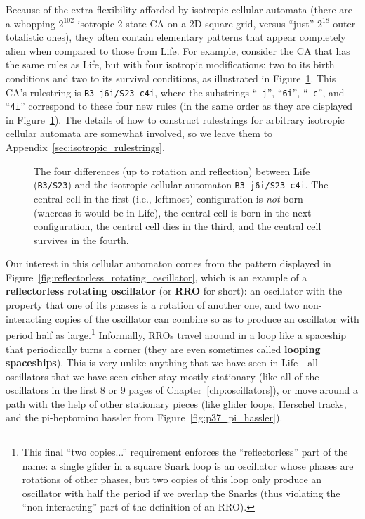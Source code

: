 Because of the extra flexibility afforded by isotropic cellular automata (there are a whopping $2^{102}$ isotropic $2$-state CA on a 2D square grid, versus ``just'' $2^{18}$ outer-totalistic ones), they often contain elementary patterns that appear completely alien when compared to those from Life. For example, consider the CA that has the same rules as Life, but with four isotropic modifications: two to its birth conditions and two to its survival conditions, as illustrated in Figure~\ref{fig:iso_rule_modifications}. This CA's rulestring is \texttt{B3-j6i/S23-c4i}, where the substrings ``\texttt{-j}'', ``\texttt{6i}'', ``\texttt{-c}'', and ``\texttt{4i}'' correspond to these four new rules (in the same order as they are displayed in Figure~\ref{fig:iso_rule_modifications}). The details of how to construct rulestrings for arbitrary isotropic cellular automata are somewhat involved, so we leave them to Appendix~\ref{sec:isotropic_rulestrings}.

\begin{figure}[!htb]
	\centering
	\caption{The four differences (up to rotation and reflection) between Life (\texttt{B3/S23}) and the isotropic cellular automaton \texttt{B3-j6i/S23-c4i}. The central cell in the first (i.e., leftmost) configuration is \emph{not} born (whereas it would be in Life), the central cell is born in the next configuration, the central cell dies in the third, and the central cell survives in the fourth.}\label{fig:iso_rule_modifications}
\end{figure}

Our interest in this cellular automaton comes from the pattern displayed in Figure~\ref{fig:reflectorless_rotating_oscillator}, which is an example of a \textbf{reflectorless rotating oscillator} (or \textbf{RRO} for short): an oscillator with the property that one of its phases is a rotation of another one, and two non-interacting copies of the oscillator can combine so as to produce an oscillator with period half as large.\footnote{This final ``two copies...'' requirement enforces the ``reflectorless'' part of the name: a single glider in a square Snark loop is an oscillator whose phases are rotations of other phases, but two copies of this loop only produce an oscillator with half the period if we overlap the Snarks (thus violating the ``non-interacting'' part of the definition of an RRO).} Informally, RROs travel around in a loop like a spaceship that periodically turns a corner (they are even sometimes called \textbf{looping spaceships}). This is very unlike anything that we have seen in Life---all oscillators that we have seen either stay mostly stationary (like all of the oscillators in the first 8 or 9 pages of Chapter~\ref{chp:oscillators}), or move around a path with the help of other stationary pieces (like glider loops, Herschel tracks, and the pi-heptomino hassler from Figure~\ref{fig:p37_pi_hassler}).

